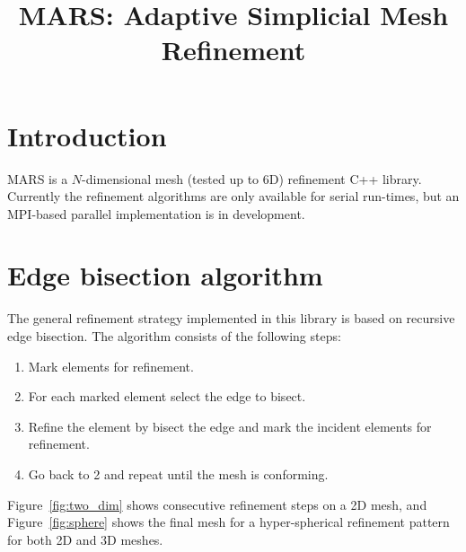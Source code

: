 \documentclass{article}
\title{MARS: Adaptive Simplicial Mesh Refinement}
\begin{document}
\maketitle

\section{Introduction}
MARS is a $N$-dimensional mesh (tested up to 6D) refinement C++ library. Currently the refinement algorithms are only available for serial run-times, but an MPI-based parallel implementation is in development.

\section{Edge bisection algorithm}
\label{sec:bisection}

The general refinement strategy implemented in this library is based on recursive edge bisection. The algorithm consists of the following steps:

\begin{enumerate}
	\item Mark elements for refinement.
	\item For each marked element select the edge to bisect.
	\item Refine the element by bisect the edge and mark the incident elements for refinement.
	\item Go back to 2 and repeat until the mesh is conforming.
\end{enumerate}

Figure~\ref{fig:two_dim} shows consecutive refinement steps on a 2D mesh, and Figure~\ref{fig:sphere} shows the final mesh for a hyper-spherical refinement pattern for both 2D and 3D meshes.
\end{document}
